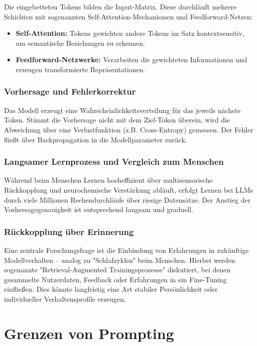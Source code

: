 Die eingebetteten Tokens bilden die Input-Matrix. Diese durchläuft mehrere Schichten mit sogenannten Self-Attention-Mechanismen und Feedforward-Netzen:
\begin{itemize}
    \item \textbf{Self-Attention:} Tokens gewichten andere Tokens im Satz kontextsensitiv, um semantische Beziehungen zu erkennen.
    \item \textbf{Feedforward-Netzwerke:} Verarbeiten die gewichteten Informationen und erzeugen transformierte Repräsentationen.
\end{itemize}

\subsection{Vorhersage und Fehlerkorrektur}

Das Modell erzeugt eine Wahrscheinlichkeitsverteilung für das jeweils nächste Token. Stimmt die Vorhersage nicht mit dem Ziel-Token überein, wird die Abweichung über eine Verlustfunktion (z.B. Cross-Entropy) gemessen. Der Fehler fließt über Backpropagation in die Modellparameter zurück.

\subsection{Langsamer Lernprozess und Vergleich zum Menschen}

Während beim Menschen Lernen hocheffizient über multisensorische Rückkopplung und neurochemische Verstärkung abläuft, erfolgt Lernen bei LLMs durch viele Millionen Rechendurchläufe über riesige Datensätze. Der Anstieg der Vorhersagegenauigkeit ist entsprechend langsam und graduell.

\subsection{Rückkopplung über Erinnerung}

Eine zentrale Forschungsfrage ist die Einbindung von Erfahrungen in zukünftige Modellverhalten -- analog zu "Schlafzyklen" beim Menschen. Hierbei werden sogenannte "Retrieval-Augmented Trainingsprozesse" diskutiert, bei denen gesammelte Nutzerdaten, Feedback oder Erfahrungen in ein Fine-Tuning einfließen. Dies könnte langfristig eine Art stabiler Persönlichkeit oder individueller Verhaltensprofile erzeugen.

\chapter{Grenzen von Prompting}
